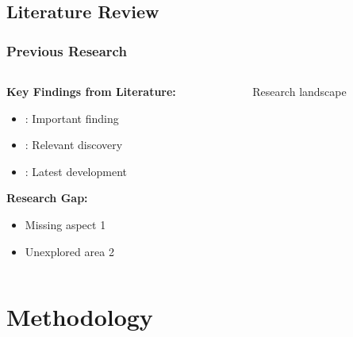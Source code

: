 \subsection{Literature Review}
\begin{frame}
    \frametitle{Previous Research}
    \begin{columns}
        \begin{column}{0.6\textwidth}
            \textbf{Key Findings from Literature:}
            \begin{itemize}
                \item {}: Important finding
                \item {}: Relevant discovery
                \item {}: Latest development
            \end{itemize}
            
            \vspace{1em}
            \textbf{Research Gap:}
            \begin{itemize}
                \item Missing aspect 1
                \item Unexplored area 2
            \end{itemize}
        \end{column}
        \begin{column}{0.4\textwidth}
            \begin{figure}
                \centering
                \caption{Research landscape}
            \end{figure}
        \end{column}
    \end{columns}
\end{frame}

\section{Methodology}

